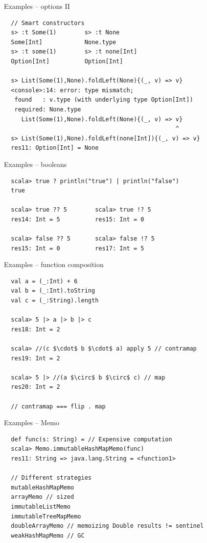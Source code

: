 \documentclass{beamer}
\begin{document}
\begin{frame}[fragile]{Examples -- options II}
  \begin{verbatim}
  // Smart constructors
  s> :t Some(1)        s> :t None
  Some[Int]            None.type
  s> :t some(1)        s> :t none[Int]
  Option[Int]          Option[Int]

  s> List(Some(1),None).foldLeft(None){(_, v) => v}
  <console>:14: error: type mismatch;
   found   : v.type (with underlying type Option[Int])
   required: None.type
     List(Some(1),None).foldLeft(None){(_, v) => v}
                                                 ^
  s> List(Some(1),None).foldLeft(none[Int]){(_, v) => v}
  res11: Option[Int] = None
  \end{verbatim}
\end{frame}

\begin{frame}[fragile]{Examples -- booleans}
  \begin{verbatim}
  scala> true ? println("true") | println("false")
  true

  scala> true ?? 5        scala> true !? 5
  res14: Int = 5          res15: Int = 0

  scala> false ?? 5       scala> false !? 5
  res15: Int = 0          res17: Int = 5
  \end{verbatim}
\end{frame}

\begin{frame}[fragile]{Examples -- function composition}
  \begin{verbatim}
  val a = (_:Int) + 6
  val b = (_:Int).toString
  val c = (_:String).length

  scala> 5 |> a |> b |> c
  res18: Int = 2

  scala> //(c $\cdot$ b $\cdot$ a) apply 5 // contramap
  res19: Int = 2

  scala> 5 |> //(a $\circ$ b $\circ$ c) // map
  res20: Int = 2

  // contramap === flip . map
  \end{verbatim}
\end{frame}

\begin{frame}[fragile]{Examples -- Memo}
  \begin{verbatim}
  def func(s: String) = // Expensive computation
  scala> Memo.immutableHashMapMemo(func)
  res11: String => java.lang.String = <function1>

  // Different strategies
  mutableHashMapMemo
  arrayMemo // sized
  immutableListMemo
  immutableTreeMapMemo
  doubleArrayMemo // memoizing Double results != sentinel
  weakHashMapMemo // GC
  \end{verbatim}
\end{frame}
\end{document}
